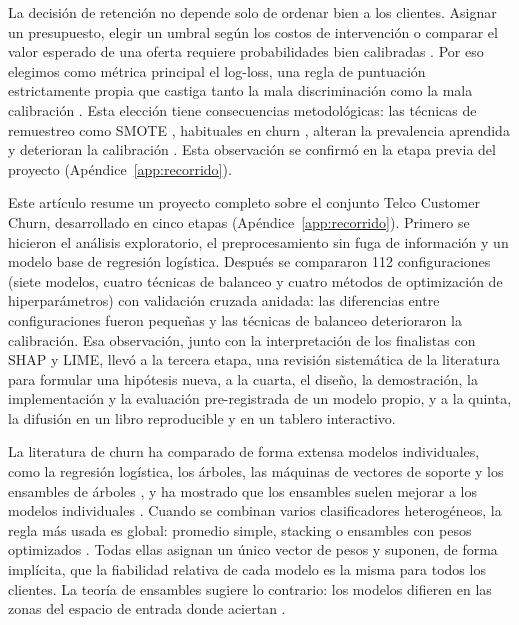 \documentclass[11pt,a4paper]{article}
\begin{document}
La decisión de retención no depende solo de ordenar bien a los clientes. Asignar un presupuesto, elegir un umbral según los costos de intervención o comparar el valor esperado de una oferta requiere probabilidades bien calibradas \cite{niculescu2005,verbeke2012}. Por eso elegimos como métrica principal el log-loss, una regla de puntuación estrictamente propia que castiga tanto la mala discriminación como la mala calibración \cite{gneiting2007}. Esta elección tiene consecuencias metodológicas: las técnicas de remuestreo como SMOTE \cite{chawla2002}, habituales en churn \cite{ahmad2019}, alteran la prevalencia aprendida y deterioran la calibración \cite{goorbergh2022}. Esta observación se confirmó en la etapa previa del proyecto (Apéndice~\ref{app:recorrido}).

Este artículo resume un proyecto completo sobre el conjunto Telco Customer Churn, desarrollado en cinco etapas (Apéndice~\ref{app:recorrido}). Primero se hicieron el análisis exploratorio, el preprocesamiento sin fuga de información y un modelo base de regresión logística. Después se compararon 112 configuraciones (siete modelos, cuatro técnicas de balanceo y cuatro métodos de optimización de hiperparámetros) con validación cruzada anidada: las diferencias entre configuraciones fueron pequeñas y las técnicas de balanceo deterioraron la calibración. Esa observación, junto con la interpretación de los finalistas con SHAP y LIME, llevó a la tercera etapa, una revisión sistemática de la literatura para formular una hipótesis nueva, a la cuarta, el diseño, la demostración, la implementación y la evaluación pre-registrada de un modelo propio, y a la quinta, la difusión en un libro reproducible y en un tablero interactivo.

La literatura de churn ha comparado de forma extensa modelos individuales, como la regresión logística, los árboles, las máquinas de vectores de soporte y los ensambles de árboles \cite{vafeiadis2015,verbeke2012,ahmad2019}, y ha mostrado que los ensambles suelen mejorar a los modelos individuales \cite{lemmens2006,debock2011}. Cuando se combinan varios clasificadores heterogéneos, la regla más usada es global: promedio simple, stacking \cite{wolpert1992,breiman1996} o ensambles con pesos optimizados \cite{khoh2023}. Todas ellas asignan un único vector de pesos y suponen, de forma implícita, que la fiabilidad relativa de cada modelo es la misma para todos los clientes. La teoría de ensambles sugiere lo contrario: los modelos difieren en las zonas del espacio de entrada donde aciertan \cite{dietterich2000}.
\end{document}
